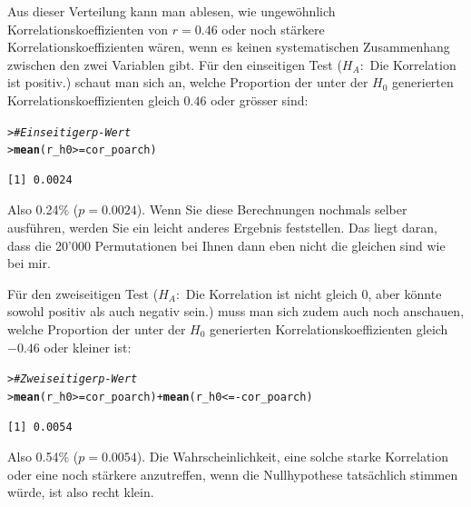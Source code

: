 \documentclass[oneside, 10pt]{book}\usepackage[]{graphicx}\usepackage[]{xcolor}
\makeatletter
\newcommand{\hlcom}[1]{\textcolor[rgb]{0.678,0.584,0.686}{\textit{#1}}}%
\newcommand{\hlopt}[1]{\textcolor[rgb]{0,0,0}{#1}}%
\newcommand{\hlstd}[1]{\textcolor[rgb]{0.345,0.345,0.345}{#1}}%
\newcommand{\hlkwd}[1]{\textcolor[rgb]{0.737,0.353,0.396}{\textbf{#1}}}%
\newenvironment{kframe}{%
 \def\at@end@of@kframe{}%
 \ifinner\ifhmode%
  \def\at@end@of@kframe{\end{minipage}}%
  \begin{minipage}{\columnwidth}%
 \fi\fi%
 \def\FrameCommand##1{\hskip\@totalleftmargin \hskip-\fboxsep
 \colorbox{shadecolor}{##1}\hskip-\fboxsep
     \hskip-\linewidth \hskip-\@totalleftmargin \hskip\columnwidth}%
 \MakeFramed {\advance\hsize-\width
   \@totalleftmargin\z@ \linewidth\hsize
   \@setminipage}}%
 {\par\unskip\endMakeFramed%
 \at@end@of@kframe}
\newenvironment{knitrout}{}{} %
\makeatother
\begin{document}
Aus dieser Verteilung kann man ablesen, wie ungewöhnlich
Korrelationskoeffizienten von $r = 0.46$ oder noch
stärkere Korrelationskoeffizienten wären, wenn es
keinen systematischen Zusammenhang zwischen den zwei Variablen
gibt. Für den einseitigen Test ($H_A:$ Die Korrelation ist positiv.)
schaut man sich an, welche Proportion der unter der $H_0$
generierten Korrelationskoeffizienten gleich $0.46$ oder grösser sind:

\begin{knitrout}
\color{fgcolor}\begin{kframe}
\begin{alltt}
\hlstd{> }\hlcom{# Einseitiger p-Wert}
\hlstd{> }\hlkwd{mean}\hlstd{(r_h0} \hlopt{>=} \hlstd{cor_poarch)}
\end{alltt}
\begin{verbatim}
[1] 0.0024
\end{verbatim}
\end{kframe}
\end{knitrout}

Also 0.24\% ($p = 0.0024$). Wenn Sie diese Berechnungen
nochmals selber ausführen, werden Sie ein leicht anderes Ergebnis
feststellen. Das liegt daran, dass die 20'000 Permutationen
bei Ihnen dann eben nicht die gleichen sind wie bei mir.

Für den zweiseitigen Test ($H_A:$ Die Korrelation ist nicht gleich
0, aber könnte sowohl positiv als auch negativ sein.) muss man
sich zudem auch noch anschauen, welche Proportion der unter der
$H_0$ generierten Korrelationskoeffizienten gleich $-0.46$ oder kleiner ist:

\begin{knitrout}
\color{fgcolor}\begin{kframe}
\begin{alltt}
\hlstd{> }\hlcom{# Zweiseitiger p-Wert}
\hlstd{> }\hlkwd{mean}\hlstd{(r_h0} \hlopt{>=} \hlstd{cor_poarch)} \hlopt{+} \hlkwd{mean}\hlstd{(r_h0} \hlopt{<= -}\hlstd{cor_poarch)}
\end{alltt}
\begin{verbatim}
[1] 0.0054
\end{verbatim}
\end{kframe}
\end{knitrout}

Also 0.54\% ($p = 0.0054$). Die Wahrscheinlichkeit,
eine solche starke Korrelation oder eine noch stärkere
anzutreffen, wenn die Nullhypothese tatsächlich stimmen
würde, ist also recht klein.
\end{document}
